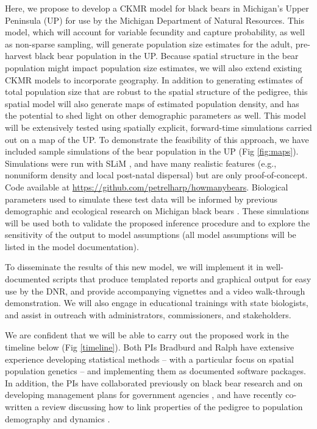 \documentclass[11pt]{article}
\begin{document}
Here, we propose to develop a CKMR model 
for black bears in Michigan's Upper Peninsula (UP) 
for use by the Michigan Department of Natural Resources.
This model, which will account for 
variable fecundity and capture probability, 
as well as non-sparse sampling, 
will generate population size estimates 
for the adult, pre-harvest black bear population in the UP. 
Because spatial structure in the bear population might impact 
population size estimates, 
we will also extend existing CKMR models 
to incorporate geography.
In addition to generating estimates of total population size 
that are robust to the spatial structure of the pedigree, 
this spatial model will also generate maps of estimated 
population density, 
and has the potential to shed light 
on other demographic parameters as well.
This model will be extensively tested using spatially explicit,  
forward-time simulations carried out on a map of the UP. 
To demonstrate the feasibility of this approach, 
we have included sample simulations 
of the bear population in the UP (Fig \ref{fig:maps}).
Simulations were run with SLiM \citep{haller2018forward},
and have many realistic features 
(e.g., nonuniform density and local post-natal dispersal) 
but are only proof-of-concept.
Code available at \url{https://github.com/petrelharp/howmanybears}.
Biological parameters used to simulate these test data 
will be informed by previous demographic and ecological 
research on Michigan black bears \citep{moore2014application}.
These simulations will be used both to 
validate the proposed inference procedure 
and to explore the sensitivity of the output to model assumptions 
(all model assumptions will be listed in the model documentation).

To disseminate the results of this new model, 
we will implement it in well-documented scripts 
that produce templated reports and graphical output
for easy use by the DNR, 
and provide accompanying vignettes 
and a video walk-through demonstration. 
We will also engage in educational trainings with state biologists, 
and assist in outreach with 
administrators, commissioners, and stakeholders.

We are confident that we will be able to 
carry out the proposed work in the timeline below (Fig \ref{timeline}).
Both PIs Bradburd and Ralph have extensive 
experience developing statistical methods \citep{bedassle, SpaceMix, bradburd2018inferring} -- 
with a particular focus on spatial population genetics \citep{bradburd2019spatial, Battey_etal_2020} -- 
and implementing them as documented software packages.
In addition, the PIs have collaborated previously 
on black bear research \citep{bradburd2018inferring}
and on developing management plans 
for government agencies \citep{shaffer2017desert}, 
and have recently co-written a review discussing how to link properties of the pedigree
to population demography and dynamics \citep{bradburd2019spatial}.
\end{document}
